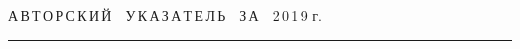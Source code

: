 




\def\stat{cont}


{%




\raggedleft\Large \bf%


А\,В\,Т\,О\,Р\,С\,К\,И\,Й\ \ У\,К\,А\,З\,А\,Т\,Е\,Л\,Ь\ \ З\,А\ \ 2\,0\,1\,9 г. \vskip 17pt


 \hrule


 \par


 }







\label{st\stat}

















\def\leftkol{\ } %


\def\rightkol{\ } %






















\def\leftfootline{\small{\textbf{\thepage}


\hfill СИСТЕМЫ И СРЕДСТВА ИНФОРМАТИКИ\ \ \ выпуск~29\ \ \ №~4\ \ \ 2019}


}%


 \def\rightfootline{\small{СИСТЕМЫ И СРЕДСТВА ИНФОРМАТИКИ\ \ \ выпуск~29\ \ \


№~4\ \ \ 2019


 \hfill \textbf{\thepage}}}





